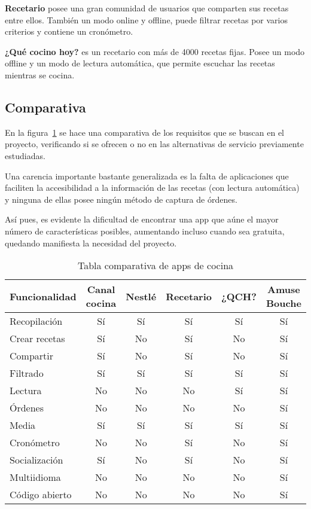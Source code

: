 \textbf{Recetario} posee una gran comunidad de usuarios que comparten sus
recetas entre ellos. También un modo online y offline, puede filtrar recetas
por varios criterios y contiene un cronómetro.

\textbf{¿Qué cocino hoy?} es un recetario con más de 4000 recetas fijas. Posee
un modo offline y un modo de lectura automática, que permite escuchar las recetas
mientras se cocina.

\subsection{Comparativa}

En la figura~\ref{comparativa_apps} se hace una comparativa de los requisitos
que se buscan en el proyecto, verificando si se ofrecen o no en las alternativas
de servicio previamente estudiadas.

Una carencia importante bastante generalizada es la falta de aplicaciones que
faciliten la accesibilidad a la información de las recetas (con lectura
automática) y ninguna de ellas posee ningún método de captura de órdenes.

Así pues, es evidente la dificultad de encontrar una app que aúne el mayor
número de características posibles, aumentando incluso cuando sea gratuita,
quedando manifiesta la necesidad del proyecto.


\begin{table}[h]
  \centering
  \begin{tabular}{|l|c|c|c|c|c|}
    \hline
    \textbf{Funcionalidad} & \textbf{Canal cocina} & \textbf{Nestlé} &
    \textbf{Recetario} & \textbf{¿QCH?} & \textbf{Amuse Bouche}\\
    \hline
    Recopilación & Sí & Sí & Sí & Sí & Sí \\
    \hline
    Crear recetas & Sí & No & Sí & No & Sí \\
    \hline
    Compartir & Sí & No & Sí & No & Sí \\
    \hline
    Filtrado & Sí & Sí & Sí & Sí & Sí \\
    \hline
    Lectura & No & No & No & Sí & Sí \\
    \hline
    Órdenes & No & No & No & No & Sí \\
    \hline
    Media & Sí & Sí & Sí & Sí & Sí \\
    \hline
    Cronómetro & No & No & Sí & No & Sí \\
    \hline
    Socialización & Sí & No & Sí & No & Sí \\
    \hline
    Multiidioma & No & No & No & No & Sí \\
    \hline
    Código abierto & No & No & No & No & Sí \\
    \hline
  \end{tabular}
  \caption{Tabla comparativa de apps de cocina}
  \label{comparativa_apps}
\end{table}


